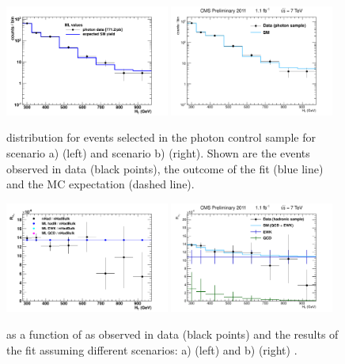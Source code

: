  \begin{figure}[h]
   \begin{center}
     \includegraphics[width = 0.48\textwidth]{Figures/Analysis/PAS/stats_plots/RQcdZero/photon_control_fit_logy.pdf}
     \includegraphics[width = 0.48\textwidth]{Figures/Analysis/PAS/stats_plots/RQcdFallingExp/photon_control_fit_logy.pdf}
     \caption{\label{fig:photon} \scalht distribution for events selected in the photon control sample for scenario a) (left) and scenario b) (right). Shown are the events observed in data (black points), the outcome of the fit (blue line) and the MC expectation (dashed line).}
   \end{center}
 \end{figure}

 \begin{figure}[h]
   \begin{center}
     \includegraphics[width = 0.48\textwidth]{Figures/Analysis/PAS/stats_plots/RQcdZero/hadronic_signal_alphaT_ratio.pdf}
     \includegraphics[width = 0.48\textwidth]{Figures/Analysis/PAS/stats_plots/RQcdFallingExp/hadronic_signal_alphaT_ratio.pdf}
     \caption{\label{fig:rat} \RaT as a function of \scalht as observed in data (black points) and the results of the fit assuming different scenarios: a) (left) and b) (right) .}
   \end{center}
 \end{figure}

